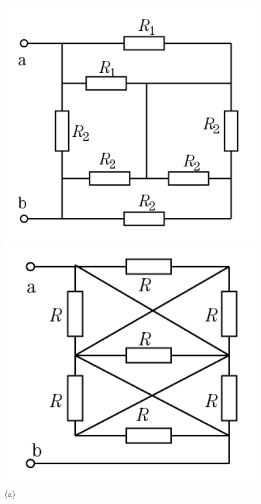 \documentclass[hyperref, UTF8]{ctexart}
\begin{document}
\begin{figure}[!htb]
  \centering
  \begin{minipage}[t]{0.243\textwidth}
    \centering
    \includegraphics[width=1\textwidth]{p2-3-a.png}
    \caption*{(a)}
  \end{minipage}
  \begin{minipage}[t]{0.217\textwidth}
    \centering
    \includegraphics[width=1\textwidth]{p2-3-b.png}

\end{minipage}
\end{figure}
\end{document}
